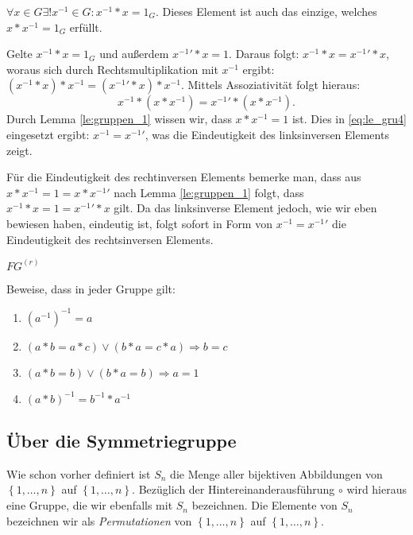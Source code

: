 \documentclass[10pt]{scrbook}
\begin{document}
\begin{Le}
$\forall x\in G\exists ! x^{-1}\in G: x^{-1}*x=1_G$. Dieses Element ist auch das einzige, welches $x*x^{-1}=1_G$ erfüllt.
\end{Le}
\begin{bew}
Gelte $x^{-1}*x=1_G$ und außerdem ${x^{-1}}'*x=1$. Daraus folgt: $x^{-1}*x={x^{-1}}'*x$, woraus sich durch Rechtsmultiplikation mit $x^{-1}$ ergibt: $(x^{-1}*x)*x^{-1}=({x^{-1}}'*x)*x^{-1}$. Mittels Assoziativität folgt hieraus: 
\begin{equation}
	x^{-1}*(x*x^{-1})={x^{-1}}'*(x*x^{-1}).
	\label{eq:le_gru4}
\end{equation}
Durch Lemma \ref{le:gruppen_1} wissen wir, dass $x*x^{-1}=1$ ist. Dies in \ref{eq:le_gru4} eingesetzt ergibt: $x^{-1}={x^{-1}}'$, was die Eindeutigkeit des linksinversen Elements zeigt.

Für die Eindeutigkeit des rechtinversen Elements bemerke man, dass aus $x*x^{-1}=1=x*{x^{-1}}'$ nach Lemma \ref{le:gruppen_1} folgt, dass $x^{-1}*x=1={x^{-1}}'*x$ gilt. Da das linksinverse Element jedoch, wie wir eben bewiesen haben, eindeutig ist, folgt sofort in Form von $x^{-1}={x^{-1}}'$ die Eindeutigkeit des rechtsinversen Elements.
\end{bew}

\begin{Bsp}$FG^{(r)}$\end{Bsp}

\begin{Auf}Beweise, dass in jeder Gruppe gilt:
\begin{enumerate}
	\item $\left(a^{-1}\right)^{-1}=a$
	\item $(a*b=a*c)\vee(b*a=c*a)\Rightarrow b=c$
	\item $(a*b=b)\vee(b*a=b)\Rightarrow a=1$
	\item $(a*b)^{-1}=b^{-1}*a^{-1}$
\end{enumerate}
\end{Auf}

\subsection{Über die Symmetriegruppe}

Wie schon vorher definiert ist $S_n$ die Menge aller bijektiven Abbildungen von $\left\{1, \ldots, n\right\}$ auf $\left\{1, \ldots, n\right\}$. Bezüglich der Hintereinanderausführung $\circ$ wird hieraus eine Gruppe, die wir ebenfalls mit $S_n$ bezeichnen. Die Elemente von $S_n$ bezeichnen wir als \emph{Permutationen} von $\left\{1, \ldots, n\right\}$ auf $\left\{1, \ldots, n\right\}$.
\end{document}
